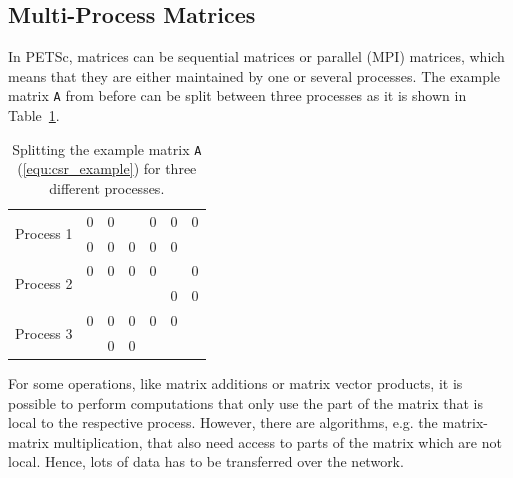\subsection{Multi-Process Matrices}
In PETSc, matrices can be sequential matrices or parallel (MPI) matrices, which means that they are either maintained by one or several processes. The example matrix \texttt{A} from before can be split between three processes as it is shown in Table~\ref{table:div_ex_matrix}.
\begin{table}[bp]
\centering
\begin{tabular}{ccc|cc|cc}   
\multirow{2}{*}{Process 1} & 0 & 0  & \color{red}{-3} & 0  & 0  & 0  \\
                           & 0 & 0  & 0  & 0  & 0  & \color{red}{8}  \\ \hline
\multirow{2}{*}{Process 2} & 0 & 0  & 0  & 0  & \color{red}{9}  & 0  \\
                           & \color{red}{5} & \color{red}{2}  & \color{red}{10} & \color{red}{-1} & 0  & 0  \\ \hline
\multirow{2}{*}{Process 3} & 0 & 0 & 0  & 0  & 0  & \color{red}{6}  \\
                           & \color{red}{4} & 0 & 0  & \color{red}{-2} & \color{red}{-4} & \color{red}{-5}
\end{tabular}
\caption{Splitting the example matrix \texttt{A} (\ref{equ:csr_example}) for three different processes.}
\label{table:div_ex_matrix}
\end{table}

For some operations, like matrix additions or matrix vector products, it is possible to perform computations that only use the part of the matrix that is local to the respective process. However, there are algorithms, e.g. the matrix-matrix multiplication, that also need access to parts of the matrix which are not local. Hence, lots of data has to be transferred over the network.

